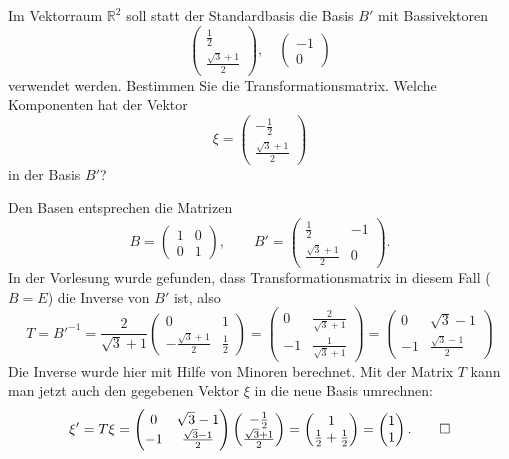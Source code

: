 Im Vektorraum $\mathbb R^2$ soll statt der Standardbasis die Basis $B'$ mit
Bassivektoren
\[
\begin{pmatrix}
\frac12\\
\frac{\sqrt{3}+1}2
\end{pmatrix},\quad
\begin{pmatrix}
-1\\
0
\end{pmatrix}
\]
verwendet werden.
Bestimmen Sie die Transformationsmatrix.
Welche Komponenten hat der Vektor
\[
\xi=
\begin{pmatrix}
-\frac12\\
\frac{\sqrt{3}+1}2
\end{pmatrix}
\]
in der Basis $B'$?

\begin{loesung}
Den Basen entsprechen die Matrizen
\[
B=\begin{pmatrix}1&0\\0&1\end{pmatrix},\qquad
B'=\begin{pmatrix}
\frac12&-1\\
\frac{\sqrt{3}+1}2&0
\end{pmatrix}.
\]
In der Vorlesung wurde gefunden, dass Transformationsmatrix in diesem
Fall ($B=E$) die Inverse von $B'$ ist, also
\[
T=B'^{-1}=\frac2{\sqrt{3}+1}\begin{pmatrix}
0&1\\
-\frac{\sqrt{3}+1}2&\frac12
\end{pmatrix}
=\begin{pmatrix}
0&\frac{2}{\sqrt{3}+1}\\
-1&\frac1{\sqrt{3}+1}
\end{pmatrix}
=
\begin{pmatrix}
0&\sqrt{3}-1\\
-1&\frac{\sqrt{3}-1}{2}
\end{pmatrix}
\]
Die Inverse wurde hier mit Hilfe von Minoren berechnet.
Mit der Matrix $T$ kann man jetzt auch den gegebenen Vektor $\xi$  in
die neue Basis umrechnen:
\[
\xi'=
T\xi
=
\begin{pmatrix}
0&\sqrt{3}-1\\
-1&\frac{\sqrt{3}-1}{2}
\end{pmatrix}
\begin{pmatrix}
-\frac12\\
\frac{\sqrt{3}+1}2
\end{pmatrix}
=
\begin{pmatrix}1\\
\frac12+\frac12\end{pmatrix}
=\begin{pmatrix}1\\1\end{pmatrix}.
\qedhere
\]
\end{loesung}

